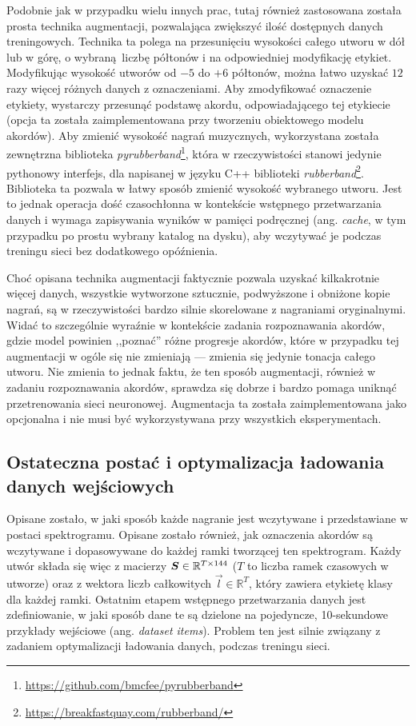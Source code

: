 Podobnie jak w przypadku wielu innych prac, tutaj również zastosowana została prosta technika augmentacji, pozwalająca zwiększyć ilość dostępnych danych treningowych. Technika ta polega na przesunięciu wysokości całego utworu w dół lub w górę, o wybraną liczbę półtonów i na odpowiedniej modyfikację etykiet. Modyfikując wysokość utworów od $-5$ do $+6$ półtonów, można łatwo uzyskać $12$ razy więcej różnych danych z oznaczeniami. Aby zmodyfikować oznaczenie etykiety, wystarczy przesunąć podstawę akordu, odpowiadającego tej etykiecie (opcja ta została zaimplementowana przy tworzeniu obiektowego modelu akordów). Aby zmienić wysokość nagrań muzycznych, wykorzystana została zewnętrzna biblioteka \emph{pyrubberband}\footnote{\url{https://github.com/bmcfee/pyrubberband}}, która w rzeczywistości stanowi jedynie pythonowy interfejs, dla napisanej w języku C++ biblioteki \emph{rubberband}\footnote{\url{https://breakfastquay.com/rubberband/}}. Biblioteka ta pozwala w łatwy sposób zmienić wysokość wybranego utworu. Jest to jednak operacja dość czasochłonna w kontekście wstępnego przetwarzania danych i wymaga zapisywania wyników w pamięci podręcznej (ang. \emph{cache}, w tym przypadku po prostu wybrany katalog na dysku), aby wczytywać je podczas treningu sieci bez dodatkowego opóźnienia.

Choć opisana technika augmentacji faktycznie pozwala uzyskać kilkakrotnie więcej danych, wszystkie wytworzone sztucznie, podwyższone i obniżone kopie nagrań, są w rzeczywistości bardzo silnie skorelowane z nagraniami oryginalnymi. Widać to szczególnie wyraźnie w kontekście zadania rozpoznawania akordów, gdzie model powinien ,,poznać'' różne progresje akordów, które w przypadku tej augmentacji w ogóle się nie zmieniają --- zmienia się jedynie tonacja całego utworu. Nie zmienia to jednak faktu, że ten sposób augmentacji, również w zadaniu rozpoznawania akordów, sprawdza się dobrze i bardzo pomaga uniknąć przetrenowania sieci neuronowej. Augmentacja ta została zaimplementowana jako opcjonalna i nie musi być wykorzystywana przy wszystkich eksperymentach.

\subsection{Ostateczna postać i optymalizacja ładowania danych wejściowych}

Opisane zostało, w jaki sposób każde nagranie jest wczytywane i przedstawiane w postaci spektrogramu.  Opisane zostało również, jak oznaczenia akordów są wczytywane i dopasowywane do każdej ramki tworzącej ten spektrogram. Każdy utwór składa się więc z macierzy $\boldsymbol{S} \in \mathbb{R}^{T \times 144}$ ($T$ to liczba ramek czasowych w utworze) oraz z wektora liczb całkowitych $\vec l \in \mathbb{R}^T$, który zawiera etykietę klasy dla każdej ramki. Ostatnim etapem wstępnego przetwarzania danych jest zdefiniowanie, w jaki sposób dane te są dzielone na pojedyncze, 10-sekundowe przykłady wejściowe (ang. \emph{dataset items}). Problem ten jest silnie związany z zadaniem optymalizacji ładowania danych, podczas treningu sieci.

